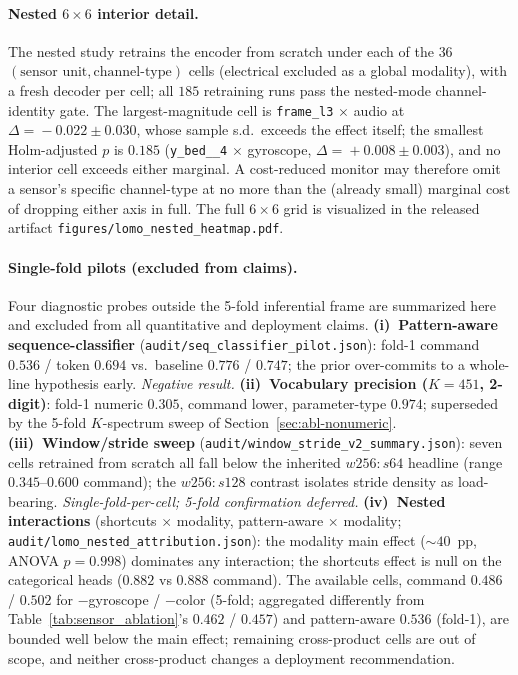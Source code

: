 \documentclass[sensors,article,submit,moreauthors,pdftex]{Definitions/mdpi}
\begin{document}
\paragraph{Nested $6\!\times\!6$ interior detail.} The nested study retrains the encoder from scratch under each of the $36$ $(\text{sensor unit},\text{channel-type})$ cells (electrical excluded as a global modality), with a fresh decoder per cell; all $185$ retraining runs pass the nested-mode channel-identity gate. The largest-magnitude cell is \texttt{frame\_l3}$\,\times\,$audio at $\Delta\!=\!-0.022\!\pm\!0.030$, whose sample s.d.\ exceeds the effect itself; the smallest Holm-adjusted $p$ is $0.185$ (\texttt{y\_bed\_\_4}$\,\times\,$gyroscope, $\Delta\!=\!+0.008\!\pm\!0.003$), and no interior cell exceeds either marginal. A cost-reduced monitor may therefore omit a sensor's specific channel-type at no more than the (already small) marginal cost of dropping either axis in full. The full $6\!\times\!6$ grid is visualized in the released artifact \texttt{figures/lomo\_nested\_heatmap.pdf}.

\paragraph{Single-fold pilots (excluded from claims).} Four diagnostic probes outside the 5-fold inferential frame are summarized here and excluded from all quantitative and deployment claims.
\textbf{(i)~Pattern-aware sequence-classifier} (\texttt{audit/\allowbreak seq\_classifier\_pilot.json}): fold-1 command $0.536$ / token $0.694$ vs.\ baseline $0.776$ / $0.747$; the prior over-commits to a whole-line hypothesis early. \emph{Negative result.}
\textbf{(ii)~Vocabulary precision ($K\!=\!451$, 2-digit)}: fold-1 numeric $0.305$, command lower, parameter-type $0.974$; superseded by the 5-fold $K$-spectrum sweep of Section~\ref{sec:abl-nonumeric}.
\textbf{(iii)~Window/stride sweep} (\texttt{audit/\allowbreak window\_stride\_v2\_summary.json}): seven cells retrained from scratch all fall below the inherited $w256{:}s64$ headline (range $0.345$--$0.600$ command); the $w256{:}s128$ contrast isolates stride density as load-bearing. \emph{Single-fold-per-cell; 5-fold confirmation deferred.}
\textbf{(iv)~Nested interactions} (shortcuts $\times$ modality, pattern-aware $\times$ modality; \texttt{audit/\allowbreak lomo\_nested\_attribution.json}): the modality main effect ($\sim\!40$~pp, ANOVA $p\!=\!0.998$) dominates any interaction; the shortcuts effect is null on the categorical heads ($0.882$ vs $0.888$ command). The available cells, command $0.486$ / $0.502$ for $-$gyroscope / $-$color (5-fold; aggregated differently from Table~\ref{tab:sensor_ablation}'s $0.462$ / $0.457$) and pattern-aware $0.536$ (fold-1), are bounded well below the main effect; remaining cross-product cells are out of scope, and neither cross-product changes a deployment recommendation.
\end{document}
